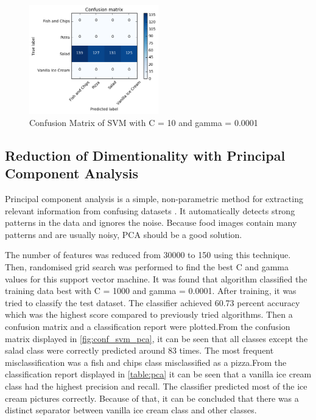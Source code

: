 \begin{figure}[h]
\centering
\includegraphics[width=0.5\textwidth]{Figures/svm2.png}
\caption{Confusion Matrix of SVM with C = 10 and gamma = 0.0001}
\label{fig:svd}
\end{figure}


\subsection{Reduction of  Dimentionality with Principal Component Analysis}
Principal component analysis is a simple, non-parametric method for extracting relevant information from confusing datasets \citep{pca}. It automatically detects strong patterns in the data and ignores the noise. Because food images contain many patterns and are usually noisy, PCA should be a good solution.  

The number of features was reduced from 30000 to 150 using this technique. Then, randomised grid search was performed to find the best C and gamma values for this support vector machine. 
It was found that algorithm classified the training data best with C = 1000 and gamma = 0.0001. After training, it was tried to classify the test dataset. The classifier achieved 60.73 percent accuracy which was the highest score compared to previously tried algorithms. Then a  confusion matrix and a classification report were plotted.From the confusion matrix displayed in \autoref{fig:conf_svm_pca}, it can be seen that all classes except the salad class were correctly predicted around 83 times. The most frequent misclassification was a fish and chips class misclassified as a pizza.From the classification report displayed in    \autoref{table:pca} it can be seen that a vanilla ice cream class had the highest precision and recall. The classifier predicted most of the ice cream pictures correctly. Because of that, it can be concluded that there was a distinct separator between vanilla ice cream class and other classes.

